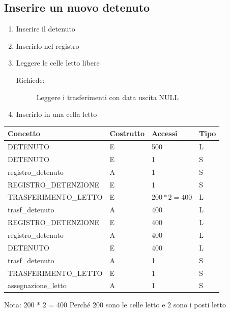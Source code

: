 \documentclass[a4paper,12pt]{report}
\begin{document}
\subsection{Inserire un nuovo detenuto} \label{inserimento}
\begin{enumerate}
    \item Inserire il detenuto
    \item Inserirlo nel registro
    \item Leggere le celle letto libere
        \begin{description}
            \item[Richiede:] Leggere i trasferimenti con data uscita NULL
        \end{description}
    \item Inserirlo in una cella letto
\end{enumerate}
\begin{table}[H]
\begin{tabular}{p{5cm} p{2cm} p{2cm} p{1cm}}
\hline
Concetto & Costrutto & Accessi & Tipo \\ \hline
DETENUTO & E & 500 & L \\
DETENUTO & E & 1 & S \\
registro\_detenuto & A & 1 & S \\
REGISTRO\_DETENZIONE & E & 1 & S \\
TRASFERIMENTO\_LETTO & E & \(200 * 2 = 400\) & L \\
trasf\_detenuto & A & 400 & L \\
REGISTRO\_DETENZIONE & E & 400 & L \\
registro\_detenuto & A & 400 & L \\
DETENUTO & E & 400 & L \\
trasf\_detenuto & A & 1 & S \\
TRASFERIMENTO\_LETTO & E & 1 & S \\
assegnazione\_letto & A & 1 & S \\
\end{tabular}
\end{table}
Nota: 200 * 2 = 400 Perché 200 sono le celle letto e 2 sono i posti letto
%
\end{document}
